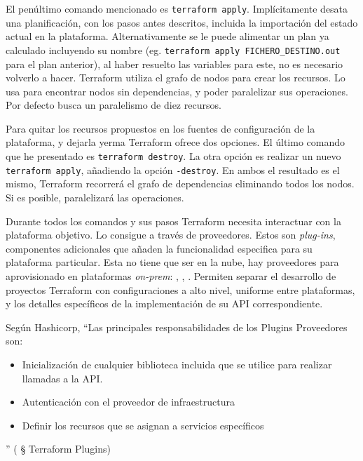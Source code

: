 \documentclass[11pt]{article}
\begin{document}
\begin{flushleft}
		El penúltimo comando mencionado es \texttt{terraform apply}. Implícitamente desata una planificación, con los pasos antes descritos, incluida la importación del estado actual en la plataforma. Alternativamente se le puede alimentar un plan ya calculado incluyendo su nombre (eg. \texttt{terraform apply FICHERO\_DESTINO.out} para el plan anterior), al haber resuelto las variables para este, no es necesario volverlo a hacer. Terraform utiliza el grafo de nodos para crear los recursos. Lo usa para encontrar nodos sin dependencias, y poder paralelizar sus operaciones. Por defecto busca un paralelismo de diez recursos.
		\linebreak
		
		Para quitar los recursos propuestos en los fuentes de configuración de la plataforma, y dejarla yerma Terraform ofrece dos opciones. El último comando que he presentado es \texttt{terraform destroy}. La otra opción es realizar un nuevo \texttt{terraform apply}, añadiendo la opción \texttt{-destroy}. En ambos el resultado es el mismo, Terraform recorrerá el grafo de dependencias eliminando todos los nodos. Si es posible, paralelizará las operaciones.
		\linebreak
		
		
		
		Durante todos los comandos y sus pasos Terraform necesita interactuar con la plataforma objetivo. Lo consigue a través de proveedores. Estos son \textit{plug-ins}, componentes adicionales que añaden la funcionalidad especifica para su plataforma particular. Esta no tiene que ser en la nube, hay proveedores para aprovisionado en plataformas \textit{on-prem}: \cite{onprem_provider1}, \cite{onprem_provider2}, \cite{onprem_provider3}. Permiten separar el desarrollo de proyectos Terraform con configuraciones a alto nivel, uniforme entre plataformas, y los detalles específicos de la implementación de su API correspondiente.
		\linebreak
		
		Según Hashicorp, ``Las principales responsabilidades de los Plugins Proveedores son:
			\begin{itemize}
				\itemsep0em 
				\item Inicialización de cualquier biblioteca incluida que se utilice para realizar llamadas a la API.
				\item Autenticación con el proveedor de infraestructura
				\item Definir los recursos que se asignan a servicios específicos
			\end{itemize}
		'' (\cite{hashicorp_plugins} § Terraform Plugins)
		\linebreak
		

\end{flushleft}
\end{document}
